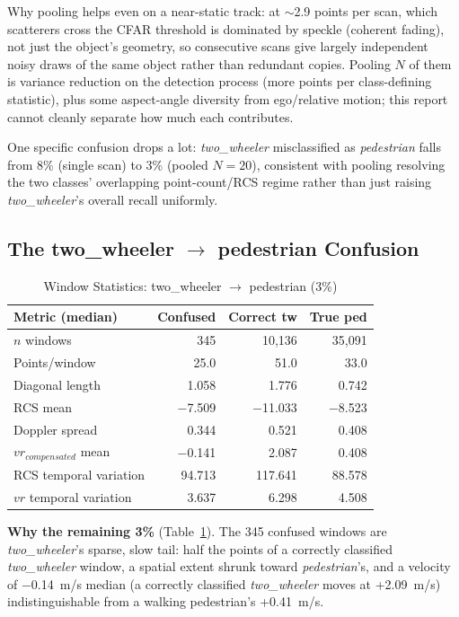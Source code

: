 \documentclass[10pt,letterpaper]{IEEEtran}
\begin{document}
Why pooling helps even on a near-static track: at $\sim$2.9 points per scan,
which scatterers cross the CFAR threshold is dominated by speckle (coherent
fading), not just the object's geometry, so consecutive scans give largely
independent noisy draws of the same object rather than redundant copies.
Pooling $N$ of them is variance reduction on the detection process (more
points per class-defining statistic), plus some aspect-angle
diversity from ego/relative motion; this report cannot cleanly separate how
much each contributes.

One specific confusion drops a lot: \emph{two\_wheeler} misclassified as
\emph{pedestrian} falls from 8\% (single scan) to 3\% (pooled $N=20$),
consistent with pooling resolving the two classes' overlapping
point-count/RCS regime rather than just raising \emph{two\_wheeler}'s overall
recall uniformly.

\subsection{The two\_wheeler $\to$ pedestrian Confusion}

\begin{table}[t]
  \centering
  \caption{Window Statistics: two\_wheeler $\to$ pedestrian (3\%)}
  \label{tab:tw-ped}
  \footnotesize
  \begin{tabular}{lrrr}
    \toprule
    Metric (median) & Confused & Correct tw & True ped \\
    \midrule
    $n$ windows                  & 345    & 10{,}136 & 35{,}091 \\
    Points/window                & 25.0   & 51.0     & 33.0     \\
    Diagonal length               & 1.058  & 1.776    & 0.742    \\
    RCS mean                     & $-$7.509 & $-$11.033 & $-$8.523 \\
    Doppler spread                & 0.344  & 0.521    & 0.408    \\
    $vr_{compensated}$ mean       & $-$0.141 & 2.087   & 0.408    \\
    RCS temporal variation        & 94.713 & 117.641  & 88.578   \\
    $vr$ temporal variation       & 3.637  & 6.298    & 4.508    \\
    \bottomrule
  \end{tabular}
\end{table}

\textbf{Why the remaining 3\%} (Table~\ref{tab:tw-ped}). The 345 confused
windows are \emph{two\_wheeler}'s sparse, slow tail: half the points of a
correctly classified \emph{two\_wheeler} window, a spatial extent shrunk
toward \emph{pedestrian}'s, and a velocity of $-$0.14~m/s median (a correctly
classified \emph{two\_wheeler} moves at +2.09~m/s) indistinguishable from a
walking pedestrian's +0.41~m/s.
\end{document}
